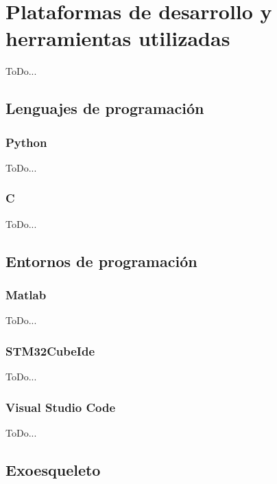 \chapter{Plataformas de desarrollo y herramientas utilizadas}
\label{cap:capitulo3}

ToDo...

\section{Lenguajes de programación}
\label{sec:lenguajes_programacion}

\subsection{Python}
\label{subsec:python}

ToDo...

\subsection{C}
\label{subsec:c}

ToDo...

\section{Entornos de programación}
\label{sec:entornos_de_programacion}

\subsection{Matlab}
\label{subsec:matlab}

ToDo...

\subsection{STM32CubeIde}
\label{subsec:stm32cubeide}

ToDo...

\subsection{Visual Studio Code}
\label{subsec:visual_studio_code}

ToDo...

\section{Exoesqueleto}
\label{sec:exoesqueleto}

